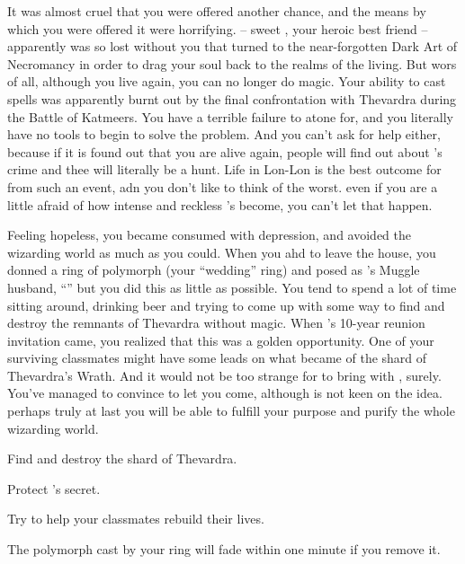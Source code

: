 \documentclass[char]{Katmeers}
\begin{document}
It was almost cruel that you were offered another chance, and the means by which you were offered it were horrifying. \cHermione{} -- sweet \cHermione{}, your heroic best friend -- apparently was so lost without you that \cHermione{\they} turned to the near-forgotten Dark Art of Necromancy in order to drag your soul back to the realms of the living. But wors of all, although you live again, you can no longer do magic. Your ability to cast spells was apparently burnt out by the final confrontation with Thevardra during the Battle of Katmeers. You have a terrible failure to atone for, and you literally have no tools to begin to solve the problem. And you can't ask for help either, because if it is found out that you are alive again, people will find out about \cHermione{}'s crime and thee will literally be a \cHermione{\magician} hunt. Life in Lon-Lon is the best outcome for \cHermione{\them} from such an event, adn you don't like to think of the worst. even if you are a little afraid of how intense and reckless \cHermione{\they}'s become, you can't let that happen.

Feeling hopeless, you became consumed with depression, and avoided the wizarding world as much as you could. When you ahd to leave the house, you donned a ring of polymorph (your ``wedding'' ring) and posed as \cHermione{}'s Muggle husband, ``\cHarry{\MYname}'' but you did this as little as possible. You tend to spend a lot of time sitting around, drinking beer and trying to come up with some way to find and destroy the remnants of Thevardra without magic. When \cHermione{}'s 10-year reunion invitation came, you realized that this was a golden opportunity. One of your surviving classmates might have some leads on what became of the shard of Thevardra's Wrath. And it would not be too strange for \cHermione{} to bring \cHermione{\their} \cHarry{\spouse} with \cHermione{\them}, surely. You've managed to convince \cHermione{} to let you come, although \cHermione{\they} is not keen on the idea. perhaps truly at last you will be able to fulfill your purpose and purify the whole wizarding world.

\begin{itemz}[Goals]
	\item Find and destroy the shard of Thevardra.
	\item Protect \cHermione{}'s secret.
	\item Try to help your classmates rebuild their lives.
\end{itemz}

\begin{itemz}[Notes]
	\item The polymorph cast by your ring will fade within one minute if you remove it.
\end{itemz}
\end{document}
